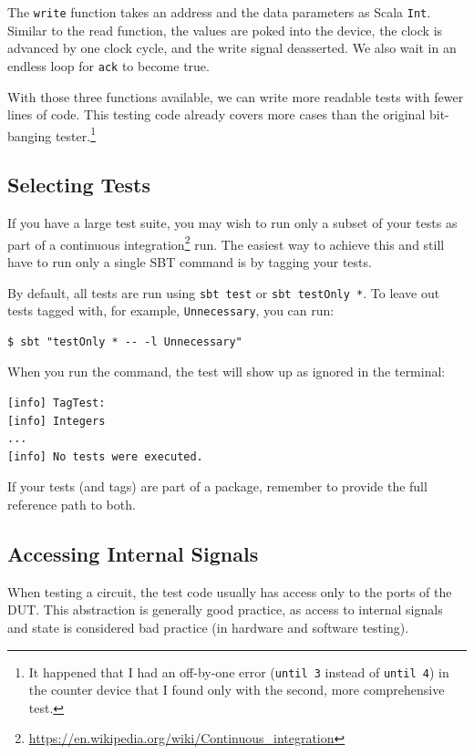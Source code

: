 \documentclass[%
    10pt,
    headinclude, footinclude=false,
    openright, %
    notitlepage,
    cleardoublepage=empty,
    headsepline,
    numbers=noenddot,
    bibliography=totoc, index=totoc,
    ]{scrbook}
\newcommand{\code}[1]{{\lstinline[basicstyle=\small\ttfamily]{#1}}}
\newcommand{\myref}[2]{\href{#1}{#2}}
\renewcommand{\myref}[2]{{#2}{\footnote{\url{#1}}}}
\begin{document}
The \code{write} function takes an address and the data parameters as Scala \code{Int}.
Similar to the read function, the values are poked into the device, the clock is advanced by one
clock cycle, and the write signal deasserted. We also wait in an endless loop for
\code{ack} to become true.

With those three functions available, we can write more readable tests with fewer lines of code.
This testing code already covers more cases than the original bit-banging
tester.\footnote{It happened that I had an off-by-one error (\code{until 3} instead of \code{until 4})
in the counter device that I found only with the second, more comprehensive test.}


\subsection{Selecting Tests}

If you have a large test suite, you may wish to run only a subset of your tests
as part of a \myref{https://en.wikipedia.org/wiki/Continuous_integration}{continuous integration}
run. The easiest way to achieve this and still have to run only a single SBT command
is by tagging your tests.


\noindent By default, all tests are run using \code{sbt test} or \code{sbt testOnly *}.
To leave out tests tagged with, for example, \code{Unnecessary}, you can run:

\begin{verbatim}
$ sbt "testOnly * -- -l Unnecessary"
\end{verbatim}

\noindent When you run the command, the test will show up as ignored in the terminal:

\begin{verbatim}
[info] TagTest:
[info] Integers
...
[info] No tests were executed.
\end{verbatim}

If your tests (and tags) are part of a package, remember to provide the full
reference path to both.

\subsection{Accessing Internal Signals}


When testing a circuit, the test code usually has access only to the ports of the DUT.
This abstraction is generally good practice, as access to internal signals and state is considered
bad practice (in hardware and software testing).
\end{document}
